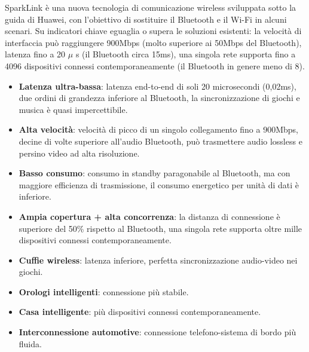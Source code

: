 
SparkLink è una nuova tecnologia di comunicazione wireless sviluppata sotto la guida di Huawei, con l'obiettivo di sostituire il Bluetooth e il Wi-Fi in alcuni scenari. Su indicatori chiave eguaglia o supera le soluzioni esistenti: la velocità di interfaccia può raggiungere 900Mbps (molto superiore ai 50Mbps del Bluetooth), latenza fino a 20 $\mu$ s (il Bluetooth circa 15ms), una singola rete supporta fino a 4096 dispositivi connessi contemporaneamente (il Bluetooth in genere meno di 8).


\begin{itemize}
  \item \textbf{Latenza ultra-bassa}: latenza end-to-end di soli 20 microsecondi (0,02ms), due ordini di grandezza inferiore al Bluetooth, la sincronizzazione di giochi e musica è quasi impercettibile.
  \item \textbf{Alta velocità}: velocità di picco di un singolo collegamento fino a 900Mbps, decine di volte superiore all'audio Bluetooth, può trasmettere audio lossless e persino video ad alta risoluzione.
  \item \textbf{Basso consumo}: consumo in standby paragonabile al Bluetooth, ma con maggiore efficienza di trasmissione, il consumo energetico per unità di dati è inferiore.
  \item \textbf{Ampia copertura + alta concorrenza}: la distanza di connessione è superiore del 50\% rispetto al Bluetooth, una singola rete supporta oltre mille dispositivi connessi contemporaneamente.
\end{itemize}


\begin{itemize}
  \item \textbf{Cuffie wireless}: latenza inferiore, perfetta sincronizzazione audio-video nei giochi.
  \item \textbf{Orologi intelligenti}: connessione più stabile.
  \item \textbf{Casa intelligente}: più dispositivi connessi contemporaneamente.
  \item \textbf{Interconnessione automotive}: connessione telefono-sistema di bordo più fluida.
\end{itemize}


